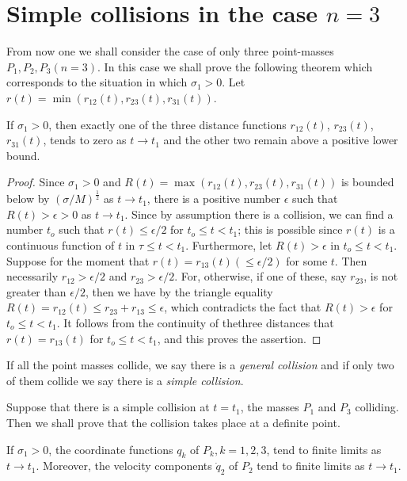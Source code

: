 \section{Simple collisions in the case $n=3$}\label{chap2:sec3}

From now one we shall consider the case of only three point-masses $P_1, P_2, P_3 (n=3)$. In this case we shall prove the following theorem which corresponds to the situation in which $\sigma_1 >0$. Let $r(t) = \min (r_{12}(t), r_{23}(t), r_{31}(t))$.

\begin{subtheorem}\label{chap2:thm2.3.1}
If $\sigma_1 >0$, then exactly one of the three distance functions $r_{12}(t)$, $r_{23} (t)$, $r_{31} (t)$, tends to zero as $t \to t_1$ and the other two remain above a positive lower bound.
\end{subtheorem}

\begin{proof}
Since $\sigma_1 >0$ and $R(t) = \max (r_{12}(t), r_{23}(t), r_{31}(t))$ is bounded below by $(\sigma/M)^{\frac{1}{2}}$ as $t \to t_1$, there is a positive number $\epsilon$ such that $R(t) > \epsilon > 0$ as $t \to t_1$. Since by assumption there is a collision, we can find a number $t_o$ such that $r(t) \leq \epsilon/2$ for $t_o \leq t < t_1$; this is possible since $r(t)$ is a continuous function of $t$ in $\tau \leq t <t_1$. Furthermore, let $R(t) > \epsilon$ in $t_o \leq t < t_1$. Suppose for the moment that $r(t) = r_{13}(t) (\leq \epsilon/2)$ for some $t$. Then necessarily $r_{12} > \epsilon/2$ and $r_{23} > \epsilon /2$. For, otherwise, if one of these, say $r_{23}$, is not greater than $\epsilon/2$, then we have by the triangle equality $R(t) = r_{12} (t) \leq r_{23} + r_{13} \leq \epsilon$, which contradicts the fact that $R(t) > \epsilon$ for $t_o \leq t <t_1$. It follows from the continuity of the\pageoriginale three distances that $r(t) = r_{13} (t)$ for $t_o \leq t < t_1$, and this proves the assertion.
\end{proof}

If all the point masses collide, we say there is a {\em general collision} and if only two of them collide we say there is a {\em simple collision}.

Suppose that there is a simple collision at $t = t_1$, the masses $P_1$ and $P_3$ colliding. Then we shall prove that the collision takes place at a definite point.

\begin{subtheorem}\label{chap2:thm2.3.2}
If $\sigma_1>0$, the coordinate functions $q_k$ of $P_k,k = 1,2,3$, tend to finite limits as $t \to t_1$. Moreover, the velocity components $\dot{q}_2$ of $P_2$ tend to finite limits as $t \to t_1$.
\end{subtheorem}

